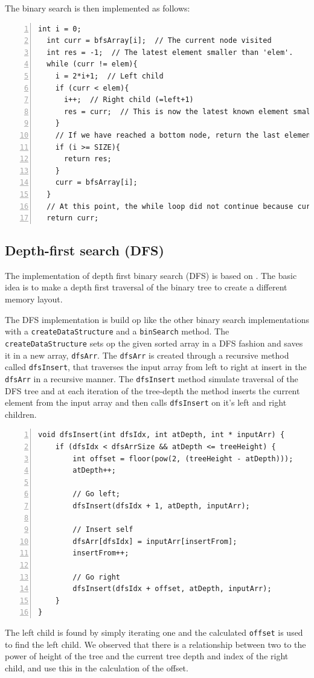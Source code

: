 The binary search is then implemented as follows:
\begin{lstlisting}[numbers=left]
  int i = 0;
  int curr = bfsArray[i];  // The current node visited
  int res = -1;  // The latest element smaller than 'elem'.
  while (curr != elem){
    i = 2*i+1;  // Left child
    if (curr < elem){
      i++;  // Right child (=left+1)
      res = curr;  // This is now the latest known element smaller than 'elem'.
    }
    // If we have reached a bottom node, return the last element lower than 'elem'.
    if (i >= SIZE){
      return res;
    }
    curr = bfsArray[i];
  }
  // At this point, the while loop did not continue because curr==elem
  return curr;
\end{lstlisting}



\subsection{Depth-first search (DFS)}
The implementation of depth first binary search (DFS) is based on \citep{binAlg}. 
The basic idea is to make a depth first traversal of the binary tree to create a different memory layout. 

The DFS implementation is build op like the other binary search implementations with a \verb!createDataStructure! and a \verb!binSearch! method. 
The \verb!createDataStructure! sets op the given sorted array in a DFS fashion and saves it in a new array, \verb!dfsArr!. 
The \verb!dfsArr! is created through a recursive method called \verb!dfsInsert!, that traverses the input array from left to right at insert in the \verb!dfsArr! in a recursive manner. 
The \verb!dfsInsert! method simulate traversal of the DFS tree and at each iteration of the tree-depth the method inserts the current element from the input array and then calls \verb!dfsInsert! on it's left and right children. 
\begin{lstlisting}[numbers=left]
void dfsInsert(int dfsIdx, int atDepth, int * inputArr) {
	if (dfsIdx < dfsArrSize && atDepth <= treeHeight) {
		int offset = floor(pow(2, (treeHeight - atDepth)));
		atDepth++;
		
		// Go left;
		dfsInsert(dfsIdx + 1, atDepth, inputArr);
		
		// Insert self	
		dfsArr[dfsIdx] = inputArr[insertFrom];
		insertFrom++;
		
		// Go right
		dfsInsert(dfsIdx + offset, atDepth, inputArr);
	}
} 
\end{lstlisting}
The left child is found by simply iterating one and the calculated \verb!offset! is used to find the left child. 
We observed that there is a relationship between two to the power of height of the tree and the current tree depth and index of the right child, 
and use this in the calculation of the offset.   

